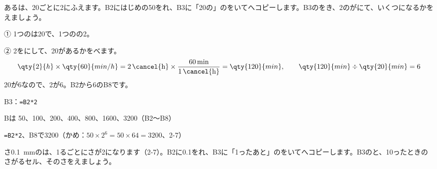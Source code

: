 \begin{reidai}[2\R{倍}{ばい}ずつふえる（\R{時間}{じ|かん}の\R{換算}{かん|さん}つき）]
あるは、20ごとに2にふえます。B2にはじめの50をれ、B3に「20の」のをいてへコピーします。B3のをき、2のがにて、いくつになるかをえましょう。\par
\kangaekata ① 1つのは20で、1つのの2。\par
\hspace*{2.6\zw}② 2をにして、20があるかをべます。
\[ \qty{2}{h}\times\qty{60}{min/h}=2\,\cancel{\mathrm{h}}\times\frac{60\,\mathrm{min}}{1\,\cancel{\mathrm{h}}}=\qty{120}{min},\qquad \qty{120}{min}\div\qty{20}{min}=6 \]
\hspace*{2.6\zw}20が6なので、2が6。B2から6のB8です。\par
\shiki B3：\texttt{=B2*2}\par
\hspace*{2.6\zw}Bは 50、100、200、400、800、1600、3200（B2〜B8）\par
\kotae \texttt{=B2*2}、B8で3200（かめ：$50\times2^6=50\times64=3200$、2-7）
\end{reidai}

\begin{jibun}
さ\qty{0.1}{mm}のは、1るごとにさが2になります（2-7）。B2に0.1をれ、B3に「1ったあと」のをいてへコピーします。B3のと、10ったときのさがるセル、そのさをえましょう。
\end{jibun}


